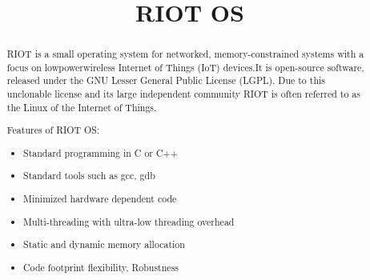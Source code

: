 \documentclass{article}
\begin{document}
\title{RIOT OS}
\maketitle

\begin{abstract}

RIOT is a small operating system for networked, memory-constrained systems with a focus on lowpowerwireless Internet of Things (IoT) devices.It is open-source software, released under the GNU Lesser General Public License (LGPL). Due to this unclonable license and its large independent community RIOT is often referred to as the Linux of the Internet of Things. \cite{ref:riot}
\hfill\break

Features of RIOT OS:

\begin{itemize}
	\item  Standard programming in C or C++
   	\item  Standard tools such as gcc, gdb
	\item  Minimized hardware dependent code
	\item  Multi-threading with ultra-low threading overhead 
   	\item  Static and dynamic memory allocation
	\item  Code footprint flexibility, Robustness
\end{itemize}


	
	
\end{abstract}	
\end{document}

